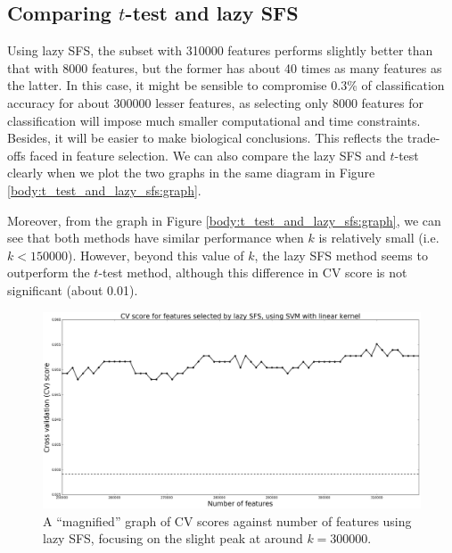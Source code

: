\documentclass[12pt, twoside, a4paper]{report}
\begin{document}
\subsection{Comparing $t$-test and lazy SFS}
Using lazy SFS, the subset with 310000 features performs slightly better than that with 8000 features, but the former has about 40 times as many features as the latter. In this case, it might be sensible to compromise 0.3\% of classification accuracy for about 300000 lesser features, as selecting only 8000 features for classification will impose much smaller computational and time constraints. Besides, it will be easier to make biological conclusions. This reflects the trade-offs faced in feature selection. We can also compare the lazy SFS and $t$-test clearly when we plot the two graphs in the same diagram in Figure \ref{body:t_test_and_lazy_sfs:graph}.

Moreover, from the graph in Figure \ref{body:t_test_and_lazy_sfs:graph}, we can see that both methods have similar performance when $k$ is relatively small (i.e. $k<150000$). However, beyond this value of $k$, the lazy SFS method seems to outperform the $t$-test method, although this difference in CV score is not significant (about 0.01).

\begin{figure}
\centering
\includegraphics[width=\textwidth]{images/lazy_sfs_smaller_range.jpeg}
\caption{A ``magnified'' graph of CV scores against number of features using lazy SFS, focusing on the slight peak at around $k=300000$.}
\label{body:lazy_sfs_smaller_range:graph}
\end{figure}
\end{document}
